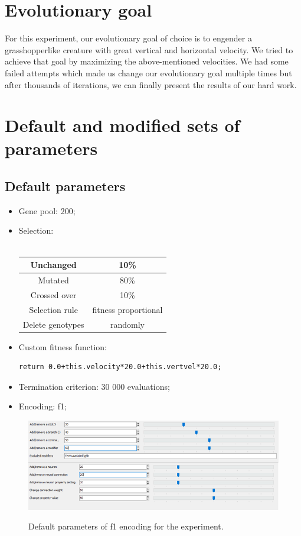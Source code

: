 \documentclass[a4]{article}
\begin{document}
\section{Evolutionary goal}
For this experiment, our evolutionary goal of choice is to engender a grasshopperlike creature with great vertical and horizontal velocity. We tried to achieve that goal by maximizing the above-mentioned velocities. We had some failed attempts which made us change our evolutionary goal multiple times but after thousands of iterations, we can finally present the results of our hard work.
\section{Default and modified sets of parameters}
\subsection{Default parameters}
\begin{itemize}
	\item Gene pool: 200;
	\item Selection:\\ \\ \begin{tabular}{ |c|c| } 
		\hline 
		Unchanged & 10\% \\
		\hline 
		Mutated & 80\% \\
		\hline 
		Crossed over & 10\% \\
		\hline 
		Selection rule & fitness proportional \\
		\hline 
		Delete genotypes & randomly \\ 
		\hline
	\end{tabular}
	\item Custom fitness function:
	\begin{verbatim} 
return 0.0+this.velocity*20.0+this.vertvel*20.0;
	\end{verbatim}
	\item Termination criterion: 30 000 evaluations;
	\item Encoding: f1;
\end{itemize}
\begin{figure}[H]
	\includegraphics[scale=0.7]{f1params-starting}
    \label{fig:params}
    \caption{Default parameters of f1 encoding for the experiment.}
\end{figure}
\end{document}
